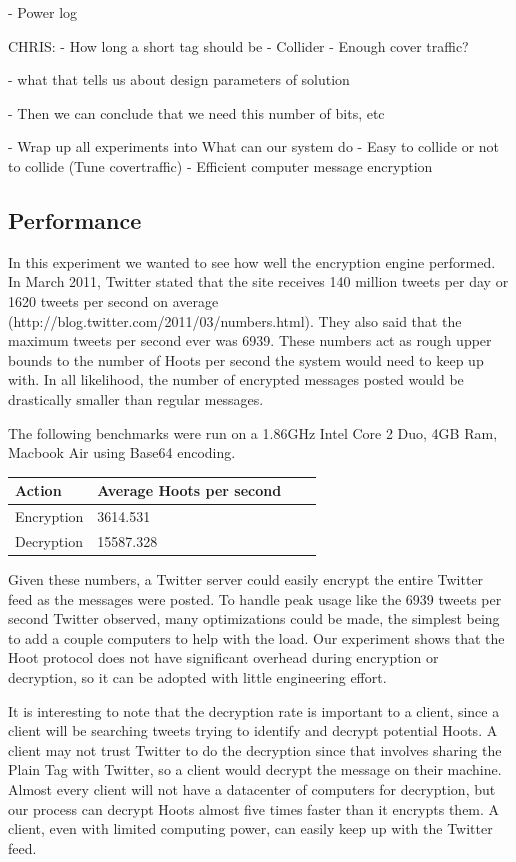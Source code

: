 \documentclass{acm_proc_article-sp}
\begin{document}
- Power log

CHRIS:
- How long a short tag should be
- Collider
- Enough cover traffic?

- what that tells us about design parameters of solution

- Then we can conclude that we need this number of bits, etc

- Wrap up all experiments into What can our system do
	- Easy to collide or not to collide (Tune covertraffic)
	- Efficient computer message encryption

\subsection{Performance}

In this experiment we wanted to see how well the encryption engine performed. In March 2011, Twitter stated that the site receives 140 million tweets per day or 1620 tweets per second on average (http://blog.twitter.com/2011/03/numbers.html). They also said that the maximum tweets per second ever was 6939. These numbers act as rough upper bounds to the number of Hoots per second the system would need to keep up with. In all likelihood, the number of encrypted messages posted would be drastically smaller than regular messages.

The following benchmarks were run on a 1.86GHz Intel Core 2 Duo, 4GB Ram, Macbook Air using Base64 encoding. 


\begin{center}
    \begin{tabular}{ | l | l | l | p{5cm} |}
    \hline
	Action & Average Hoots per second \\ \hline
	Encryption & 3614.531 \\ \hline
	Decryption & 15587.328 \\ \hline
    \end{tabular}
\end{center}

Given these numbers, a Twitter server could easily encrypt the entire Twitter feed as the messages were posted. To handle peak usage like the 6939 tweets per second Twitter observed, many optimizations could be made, the simplest being to add a couple computers to help with the load. Our experiment shows that the Hoot protocol does not have significant overhead during encryption or decryption, so it can be adopted with little engineering effort.

It is interesting to note that the decryption rate is important to a client, since a client will be searching tweets trying to identify and decrypt potential Hoots. A client may not trust Twitter to do the decryption since that involves sharing the Plain Tag with Twitter, so a client would decrypt the message on their machine. Almost every client will not have a datacenter of computers for decryption, but our  process can decrypt Hoots almost five times faster than it encrypts them. A client, even with limited computing power, can easily keep up with the Twitter feed.
\end{document}
